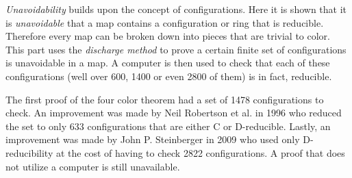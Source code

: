 \textit{Unavoidability} builds upon the concept of configurations. Here it is shown that it is \textit{unavoidable} that a map contains a configuration or ring that is reducible. Therefore every map can be broken down into pieces that are trivial to color. This part uses the \textit{discharge method} to prove a certain finite set of configurations is unavoidable in a map. A computer is then used to check that each of these configurations (well over 600, 1400 or even 2800 of them) is in fact, reducible.

The first proof of the four color theorem had a set of 1478 configurations to check. An improvement was made by Neil Robertson et al. \cite{thomas} in 1996 who reduced the set to only 633 configurations that are either C or D-reducible. Lastly, an improvement was made by John P. Steinberger in 2009 who used only D-reducibility at the cost of having to check 2822 configurations. A proof that does not utilize a computer is still unavailable.